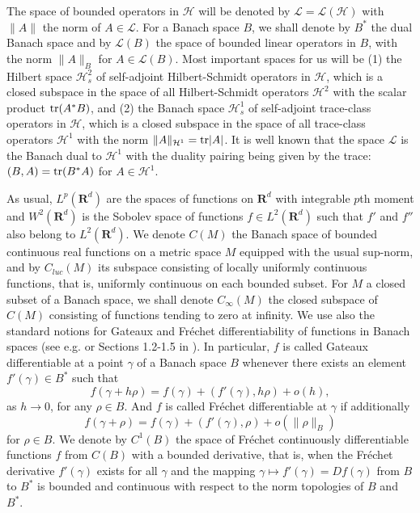\documentclass[12pt]{article}
\def\LC{\mathcal{L}}
\def\HC{\mathcal{H}}
\def\R{\mathbf{R}}
\def\tr{\rm{tr}}
\def\ga{\gamma}
\begin{document}
The space of bounded operators in $\HC$ will be denoted by $\LC=\LC(\HC)$
with $\|A\|$ the norm of $A\in \LC$.
For a Banach space $B$, we shall denote by $B^*$ the dual Banach space
and by  $\LC(B)$ the space of bounded linear operators in $B$, with the norm $\|A\|_{B}$
for $A\in \LC(B)$. Most important spaces for us will be (1)
the Hilbert space $\HC^2_s$ of self-adjoint Hilbert-Schmidt
operators in $\HC$, which is a closed subspace
in the space of all Hilbert-Schmidt operators $\HC^2$
with the scalar product ${\tr} (A^*B)$, and (2) the Banach space
$\HC^1_s$ of self-adjoint trace-class
operators in $\HC$, which is a closed subspace
in the space of all trace-class operators $\HC^1$
with the norm $\|A\|_{\HC^1}={\tr} |A|$. It is well known that the space $\LC$
is the Banach dual to $\HC^1$ with the duality pairing being given by the trace:
$(B,A)={\tr}(B^*A)$ for $A\in \HC^1$.

As usual, $L^p(\R^d)$ are the spaces of functions on $\R^d$ with integrable $p$th moment
and $W^2(\R^d)$ is the Sobolev space of functions $f\in L^2(\R^d)$ such that $f'$ and $f''$
also belong to $L^2(\R^d)$.
We denote $C(M)$ the Banach space of bounded continuous
real functions on a metric space $M$ equipped with the usual sup-norm,
and by $C_{luc}(M)$ its subspace consisting of locally uniformly continuous
functions, that is, uniformly continuous on each bounded subset.
For $M$ a closed subset of a Banach space, we shall denote $C_{\infty}(M)$
the closed subspace of $C(M)$ consisting of functions tending to zero at infinity.
We use also the standard notions for Gateaux and Fr\'echet differentiability of
functions in Banach spaces (see e.g. \cite{Toolbox} or Sections 1.2-1.5 in \cite{Kolbook19}).
In particular, $f$ is called Gateaux differentiable at a point $\ga$ of a Banach space $B$
whenever there exists an element $f'(\ga)\in B^*$ such that
\[
f(\ga+h\rho)=f(\ga)+(f'(\ga), h\rho)+o(h),
\]
as $h\to 0$, for any $\rho \in B$. And  $f$ is called Fr\'echet differentiable at $\ga$
if additionally
\[
f(\ga+\rho)=f(\ga)+(f'(\ga), \rho)+o(\|\rho\|_B)
\]
for $\rho \in B$.
We denote by $C^1(B)$ the space of Fr\'echet continuously differentiable
functions $f$ from $C(B)$ with a bounded derivative, that is, when the Fr\'echet
derivative $f'(\ga)$ exists for all $\ga$ and  the mapping $\ga\mapsto f'(\ga)=Df(\ga)$
from $B$ to $B^*$ is bounded and continuous with respect to the norm topologies of $B$ and $B^*$.
\end{document}
